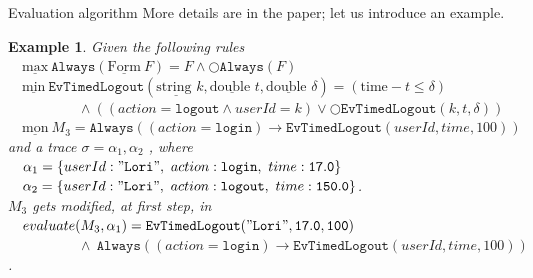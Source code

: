\documentclass[aspectratio=169,t,xcolor=table]{beamer}
\newtheorem{ex}{Example}
\begin{document}
\begin{frame}[allowframebreaks]{Evaluation algorithm}
    \newpage
    More details are in the paper; let us introduce an example.
    \begin{ex}
        Given the following rules\\
        \vspace{1.5mm}
        $\quad\underline{\text{max}}\ \mathtt{Always}(\underline{\text{Form}}\ F)  = F \land \bigcirc \mathtt{Always}(F)$ \\
        $\quad\underline{\text{min}}\ \mathtt{EvTimedLogout}(\underline{\text{string }} k, \underline{\text{double }} t, \underline{\text{double }} \delta) = (\text{time} - t \leq \delta)$ \\
        $\quad\quad\quad\quad\quad \land ((action = \mathtt{logout} \land userId = k) \lor \bigcirc \mathtt{EvTimedLogout}(k, t, \delta))$ \\
        $\quad\underline{\text{mon}}\ M_3  = \mathtt{Always}((action = \mathtt{login}) \rightarrow \mathtt{EvTimedLogout}(userId,time, 100))$ \\
        \vspace{1.5mm}
        and a trace $\sigma=\alpha_1,\alpha_2$ , where\\\vspace{1.5mm} $\quad\alpha_1=\{userId:\mathtt{"Lori"},\ action:\mathtt{login},\ time:\mathtt{17.0}\}$\\ $\quad\alpha_2=\{userId:\mathtt{"Lori"},\ action:\mathtt{logout},\ time:\mathtt{150.0}\}$.\\ \vspace{1.5mm}$M_3$ gets modified, at first step, in \\
        \vspace{1.5mm}
        $\quad evaluate(M_3,\alpha_1)  = \mathtt{EvTimedLogout("Lori",17.0, 100)}$ \\ 
        $\quad\quad\quad\quad\quad \land\ \mathtt{Always}((action = \mathtt{login}) \rightarrow \mathtt{EvTimedLogout}(userId,time, 100))$.
    \end{ex}    %
\end{frame}
\end{document}
